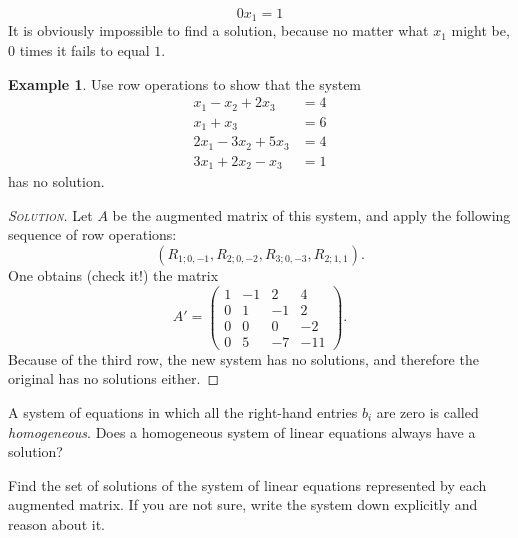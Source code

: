 \documentclass[12pt]{exam}
\theoremstyle{definition}
\newtheorem{example}{Example}
\begin{document}
\[
    0x_1 = 1
\]
It is obviously impossible to find a solution, because no matter what $x_1$ might be, $0$ times it fails to equal $1$.
\begin{example}
    Use row operations to show that the system
    \begin{align*}
        x_1 - x_2 + 2x_3 &= 4 \\             
        x_1 + x_3 &= 6 \\
        2x_1 - 3x_2 + 5x_3 &= 4 \\
        3x_1 + 2x_2 - x_3 &= 1
    \end{align*}
    has no solution.
\end{example}
\begin{proof}[\textsc{Solution}]
    Let $A$ be the augmented matrix of this system, and apply the following sequence of row operations:
    \[
        (R_{1;0,-1}, R_{2;0,-2}, R_{3;0,-3}, R_{2;1,1}).
    \]
    One obtains (check it!) the matrix
    \[
        A' = \begin{pmatrix}
            1 & -1 & 2 & 4 \\
            0 & 1 & -1 & 2 \\
            0 & 0 & 0  & -2 \\
            0 & 5 & -7 & -11
        \end{pmatrix}.
    \]
    Because of the third row, the new system has no solutions, and therefore the original has no solutions either.
\end{proof}
A system of equations in which all the right-hand entries $b_{i}$ are zero is called \emph{homogeneous}. Does a homogeneous system of linear equations always have a solution?

Find the set of solutions of the system of linear equations represented by each augmented matrix. If you are not sure, write the system down explicitly and reason about it. 
\end{document}
